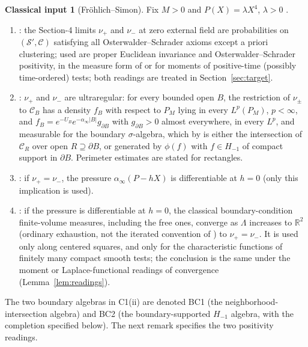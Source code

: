 \documentclass[11pt]{article}
\theoremstyle{plain}
\theoremstyle{definition}
\newtheorem{classical}{Classical input}
\theoremstyle{remark}
\newcommand{\R}{\mathbb{R}}
\newcommand{\cC}{\mathcal{C}}
\newcommand{\cS}{\mathcal{S}}
\begin{document}
\begin{classical}[Fr\"ohlich--Simon]\label{prem:C1}
Fix $M>0$ and $P(X)=\lambda X^{4}$, $\lambda>0$ \cite{FS1977}.
\begin{enumerate}[label=(\roman*)]
\item \cite[Thm.~4.1, p.~509]{FS1977}: the Section-4 limits $\nu_{+}$ and
  $\nu_{-}$ at zero external field are probabilities on $(\cS',\cC)$ satisfying
  all Osterwalder--Schrader axioms except a priori clustering; used are proper
  Euclidean invariance and Osterwalder--Schrader positivity, in the measure
  form of \cite[p.~495, (a)--(b)]{FS1977} or for moments of positive-time
  (possibly time-ordered) tests; both readings are treated in
  Section~\ref{sec:target}.
\item \cite[\S6 definition, pp.~513--514, Remarks~1--2 and Thm.~6.1; Thm.~7.2,
  p.~517; (1.2b), p.~498]{FS1977}: $\nu_+$ and $\nu_-$ are ultraregular: for every
  bounded open $B$, the restriction of $\nu_\pm$ to $\cC_B$ has a density $f_B$ with
  respect to $P_M$ lying in every $L^{p}(P_M)$, $p<\infty$, and
  $f_B=e^{-U_B}e^{-\alpha_\infty|B|}g_{\partial B}$ with $g_{\partial B}>0$ almost
  everywhere, in every $L^{p}$, and measurable for the boundary $\sigma$-algebra,
  which by \cite[p.~514, Remark~2]{FS1977} is either the intersection of
  $\cC_R$ over open $R\supseteq\partial B$, or generated by $\phi(f)$ with
  $f\in H_{-1}$ of compact support in $\partial B$. Perimeter estimates are
  stated for rectangles.
\item \cite[Cor.~4.3(ii), p.~510]{FS1977}: if $\nu_+=\nu_-$, the pressure
  $\alpha_\infty(P-hX)$ is differentiable at $h=0$ (only this implication is used).
\item \cite[Thm.~5.2, p.~512]{FS1977}: if the pressure is differentiable at
  $h=0$, the classical boundary-condition finite-volume measures, including
  the free ones, converge as $\Lambda$ increases to $\R^{2}$ (ordinary
  exhaustion, not the iterated convention of \cite[p.~503]{FS1977}) to
  $\nu_+=\nu_-$. It is used only along centered squares, and only for the
  characteristic functions of finitely many compact smooth tests; the
  conclusion is the same under the moment or Laplace-functional readings of
  convergence (Lemma~\ref{lem:readings}).
\end{enumerate}
\end{classical}

The two boundary algebras in C1(ii) are denoted BC1 (the neighborhood-intersection algebra) and BC2 (the boundary-supported $H_{-1}$ algebra, with the completion specified below). The next remark specifies the two positivity readings.
\end{document}
